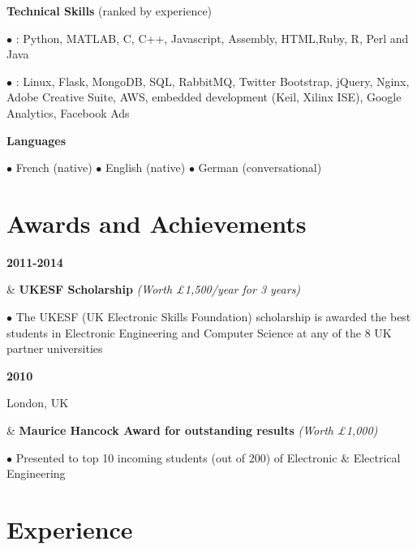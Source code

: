 \documentclass[a4paper,10pt,oneside]{article}
\begin{document}
\begin{flushleft}
	\vspace{-0.8em}
	
	
	\hspace{1em} \textbf{Technical Skills} (ranked by experience)
	
	\hspace{2em} $\bullet$ \underline{}: Python, MATLAB, C, C++, Javascript, Assembly, HTML,Ruby, R, Perl and Java
	
	\hspace{2em} \parbox{0.95\textwidth}{$\bullet$ \underline{}: Linux, Flask, MongoDB, SQL, RabbitMQ, Twitter Bootstrap, jQuery, Nginx, Adobe Creative Suite, AWS, embedded  development (Keil, Xilinx ISE), Google Analytics, Facebook Ads}
	
	\hspace{1em} \textbf{Languages}
	
	\hspace{2em} $\bullet$ French (native) $\bullet$ English (native) $\bullet$ German (conversational)
	
\end{flushleft}

\section*{Awards and Achievements}

\begin{body}
{\textbf{2011-2014} \par {}} & \textbf{UKESF Scholarship} \textit{(Worth £1,500/year for 3 years)}

$\bullet$ The UKESF (UK Electronic Skills Foundation) scholarship is awarded the best students in Electronic Engineering and Computer Science at any of the 8 UK partner universities
\\
{\textbf{2010} \par London, UK} & \textbf{Maurice Hancock Award for outstanding results} \textit{(Worth £1,000)}

$\bullet$ Presented to top 10 incoming students (out of 200) of Electronic \& Electrical Engineering

\end{body}

\section*{Experience}
\end{document}
